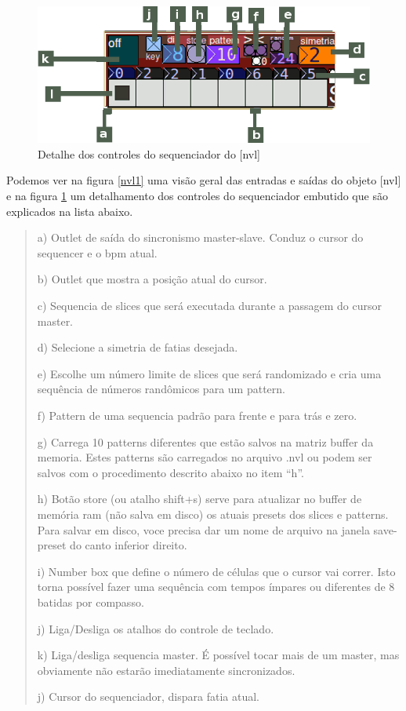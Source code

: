 \documentclass[draft]{ppgmus}
\begin{document}
\begin{figure}
\includegraphics[scale=.6]{nvl2}
\caption{Detalhe dos controles do sequenciador do [nvl]}
\label{nvl2}
\end{figure}


Podemos ver na figura \ref{nvl1} uma visão geral das entradas e saídas do objeto [nvl] e na figura
\ref{nvl2} um detalhamento dos controles do sequenciador embutido que são explicados na lista abaixo.

\begin{quote}
\begin{description}
  
\item a) Outlet de saída do sincronismo master-slave. Conduz o cursor do sequencer e o bpm atual.
\item b) Outlet que mostra a posição atual do cursor.
\item c) Sequencia de slices que será executada durante a passagem do cursor master.
\item d) Selecione a simetria de fatias desejada.
\item e) Escolhe um número limite de slices que será randomizado e cria uma sequência de números randômicos para um pattern.
\item f) Pattern de uma sequencia padrão para frente e para trás e zero.
\item g) Carrega 10 patterns diferentes que estão salvos na matriz buffer da memoria. Estes patterns são carregados no arquivo .nvl ou podem ser salvos com o procedimento descrito abaixo no item “h”.
\item h) Botão store (ou atalho shift+s) serve para atualizar no buffer de memória ram (não salva em disco) os atuais presets dos slices e patterns. Para salvar em disco, voce precisa dar um nome de arquivo na janela save-preset do canto inferior direito.
\item i) Number box que define o número de células que o cursor vai correr. Isto torna possível fazer uma sequência com tempos ímpares ou diferentes de 8 batidas por compasso.
\item j) Liga/Desliga os atalhos do controle de teclado.
\item k) Liga/desliga sequencia master. É possível tocar mais de um master, mas obviamente não estarão imediatamente sincronizados.
\item j) Cursor do sequenciador, dispara fatia atual.
\cite{navalha}
\end{description}
\end{quote}
\end{document}
